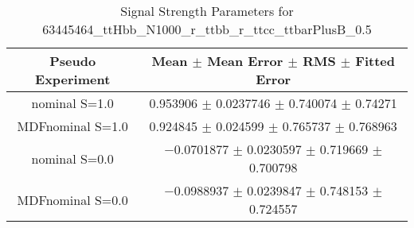 \begin{table}
\centering
\caption{Signal Strength Parameters for 63445464\_ttHbb\_N1000\_r\_ttbb\_r\_ttcc\_ttbarPlusB\_0.5}
\begin{tabular}{cc}
\toprule
Pseudo Experiment & Mean $\pm$ Mean Error $\pm$ RMS $\pm$ Fitted Error\\
\midrule
nominal S=1.0 & \num{0.953906} $\pm$ \num{0.0237746} $\pm$ \num{0.740074} $\pm$ \num{0.74271}\\
MDFnominal S=1.0 & \num{0.924845} $\pm$ \num{0.024599} $\pm$ \num{0.765737} $\pm$ \num{0.768963}\\
nominal S=0.0 & \num{-0.0701877} $\pm$ \num{0.0230597} $\pm$ \num{0.719669} $\pm$ \num{0.700798}\\
MDFnominal S=0.0 & \num{-0.0988937} $\pm$ \num{0.0239847} $\pm$ \num{0.748153} $\pm$ \num{0.724557}\\
\bottomrule
\end{tabular}
\end{table}